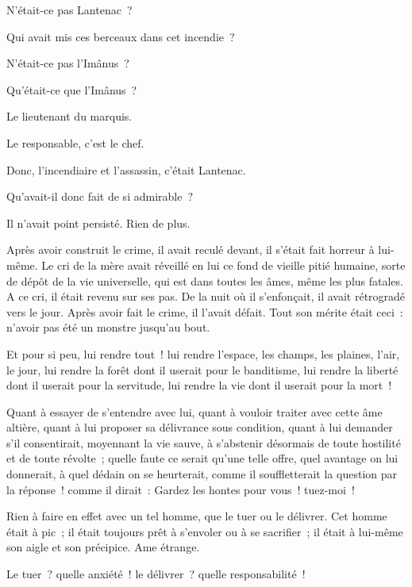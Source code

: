 \documentclass[french,twoside]{book} %
\begin{document}
N’était-ce pas Lantenac ?\par
Qui avait mis ces berceaux dans cet incendie ?\par
N’était-ce pas l’Imânus ?\par
Qu’était-ce que l’Imânus ?\par
Le lieutenant du marquis.\par
Le responsable, c’est le chef.\par
Donc, l’incendiaire et l’assassin, c’était Lantenac.\par
Qu’avait-il donc fait de si admirable ?\par
Il n’avait point persisté. Rien de plus.\par
Après avoir construit le crime, il avait reculé devant, il s’était fait horreur à lui-même. Le cri de la mère avait réveillé en lui ce fond de vieille pitié humaine, sorte de dépôt de la vie universelle, qui est dans toutes les âmes, même les plus fatales. A ce cri, il était revenu sur ses pas. De la nuit où il s’enfonçait, il avait rétrogradé vers le jour. Après avoir fait le crime, il l’avait défait. Tout son mérite était ceci : n’avoir pas été un monstre jusqu’au bout.\par
Et pour si peu, lui rendre tout ! lui rendre l’espace, les champs, les plaines, l’air, le jour, lui rendre la forêt dont il userait pour le banditisme, lui rendre la liberté dont il userait pour la servitude, lui rendre la vie dont il userait pour la mort !\par
 Quant à essayer de s’entendre avec lui, quant à vouloir traiter avec cette âme altière, quant à lui proposer sa délivrance sous condition, quant à lui demander s’il consentirait, moyennant la vie sauve, à s’abstenir désormais de toute hostilité et de toute révolte ; quelle faute ce serait qu’une telle offre, quel avantage on lui donnerait, à quel dédain on se heurterait, comme il souffletterait la question par la réponse ! comme il dirait : Gardez les hontes pour vous ! tuez-moi !\par
Rien à faire en effet avec un tel homme, que le tuer ou le délivrer. Cet homme était à pic ; il était toujours prêt à s’envoler ou à se sacrifier ; il était à lui-même son aigle et son précipice. Ame étrange.\par
Le tuer ? quelle anxiété ! le délivrer ? quelle responsabilité !\par
\end{document}

